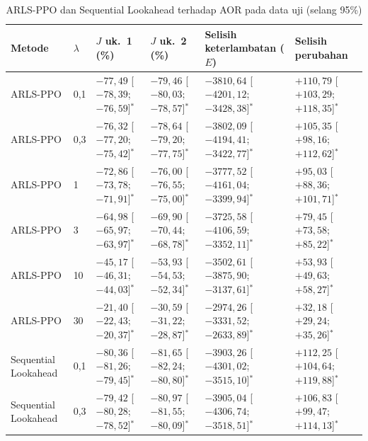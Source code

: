 \begin{table}[htbp]
\caption{ARLS-PPO dan Sequential Lookahead terhadap AOR pada data uji (selang 95\%)}
\label{tab:uji-aor}
\centering\footnotesize
\setlength{\tabcolsep}{4pt}
\begin{adjustbox}{max width=\textwidth}
\begin{tabular}{llllll}
\toprule
Metode & $\lambda$ & $J$ uk.~1 (\%) & $J$ uk.~2 (\%) & \shortstack{Selisih\\keterlambatan ($E$)} & \shortstack{Selisih\\perubahan} \\
\midrule
ARLS-PPO & 0{,}1 & $-77{,}49$ [$-78{,}39$; $-76{,}59$]$^{*}$ & $-79{,}46$ [$-80{,}03$; $-78{,}57$]$^{*}$ & $-3810{,}64$ [$-4201{,}12$; $-3428{,}38$]$^{*}$ & $+110{,}79$ [$+103{,}29$; $+118{,}35$]$^{*}$ \\
ARLS-PPO & 0{,}3 & $-76{,}32$ [$-77{,}20$; $-75{,}42$]$^{*}$ & $-78{,}64$ [$-79{,}20$; $-77{,}75$]$^{*}$ & $-3802{,}09$ [$-4194{,}41$; $-3422{,}77$]$^{*}$ & $+105{,}35$ [$+98{,}16$; $+112{,}62$]$^{*}$ \\
ARLS-PPO & 1 & $-72{,}86$ [$-73{,}78$; $-71{,}91$]$^{*}$ & $-76{,}00$ [$-76{,}55$; $-75{,}00$]$^{*}$ & $-3777{,}52$ [$-4161{,}04$; $-3399{,}94$]$^{*}$ & $+95{,}03$ [$+88{,}36$; $+101{,}71$]$^{*}$ \\
ARLS-PPO & 3 & $-64{,}98$ [$-65{,}97$; $-63{,}97$]$^{*}$ & $-69{,}90$ [$-70{,}44$; $-68{,}78$]$^{*}$ & $-3725{,}58$ [$-4106{,}59$; $-3352{,}11$]$^{*}$ & $+79{,}45$ [$+73{,}58$; $+85{,}22$]$^{*}$ \\
ARLS-PPO & 10 & $-45{,}17$ [$-46{,}31$; $-44{,}03$]$^{*}$ & $-53{,}93$ [$-54{,}53$; $-52{,}34$]$^{*}$ & $-3502{,}61$ [$-3875{,}90$; $-3137{,}61$]$^{*}$ & $+53{,}93$ [$+49{,}63$; $+58{,}27$]$^{*}$ \\
ARLS-PPO & 30 & $-21{,}40$ [$-22{,}43$; $-20{,}37$]$^{*}$ & $-30{,}59$ [$-31{,}22$; $-28{,}87$]$^{*}$ & $-2974{,}26$ [$-3331{,}52$; $-2633{,}89$]$^{*}$ & $+32{,}18$ [$+29{,}24$; $+35{,}26$]$^{*}$ \\
\addlinespace
Sequential Lookahead & 0{,}1 & $-80{,}36$ [$-81{,}26$; $-79{,}45$]$^{*}$ & $-81{,}65$ [$-82{,}24$; $-80{,}80$]$^{*}$ & $-3903{,}26$ [$-4301{,}02$; $-3515{,}10$]$^{*}$ & $+112{,}25$ [$+104{,}64$; $+119{,}88$]$^{*}$ \\
Sequential Lookahead & 0{,}3 & $-79{,}42$ [$-80{,}28$; $-78{,}52$]$^{*}$ & $-80{,}97$ [$-81{,}55$; $-80{,}09$]$^{*}$ & $-3905{,}04$ [$-4306{,}74$; $-3518{,}51$]$^{*}$ & $+106{,}83$ [$+99{,}47$; $+114{,}13$]$^{*}$ \\

\end{tabular}
\end{adjustbox}
\end{table}
